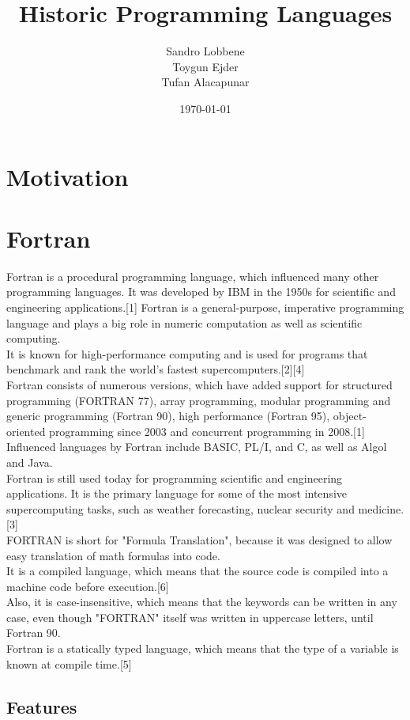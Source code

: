 \documentclass[12pt,a4paper]{scrartcl}
\title{Historic Programming Languages}
\author{Sandro Lobbene\\Toygun Ejder\\Tufan Alacapunar}
\date{\today}
\begin{document}
\maketitle

\section{Motivation}

\section{Fortran}
Fortran is a procedural programming language, which influenced many other programming languages. It was developed by IBM in the 1950s for scientific and engineering applications.[1] Fortran is a general-purpose, imperative programming language and plays a big role in numeric computation as well as scientific computing.\\
It is known for high-performance computing and is used for programs that benchmark and rank the world's fastest supercomputers.[2][4]\\
Fortran consists of numerous versions, which have added support for structured programming (FORTRAN 77), array programming, modular programming and generic programming (Fortran 90), high performance (Fortran 95), object-oriented programming since 2003 and concurrent programming in 2008.[1] Influenced languages by Fortran include BASIC, PL/I, and C, as well as Algol and Java.\\
Fortran is still used today for programming scientific and engineering applications. It is the primary language for some of the most intensive supercomputing tasks, such as weather forecasting, nuclear security and medicine. [3]\\
FORTRAN is short for "Formula Translation", because it was designed to allow easy translation of math formulas into code.\\
It is a compiled language, which means that the source code is compiled into a machine code before execution.[6]\\
Also, it is case-insensitive, which means that the keywords can be written in any case, even though "FORTRAN" itself was written in uppercase letters, until Fortran 90.\\
Fortran is a statically typed language, which means that the type of a variable is known at compile time.[5]\\

\subsection{Features}
\end{document}
